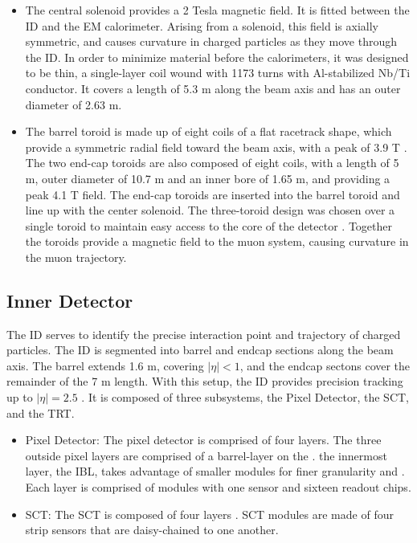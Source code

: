 \begin{itemize}
    \item The central solenoid provides a 2 Tesla magnetic field. It is fitted between the \gls{ID} and the \gls{EM} calorimeter. Arising from a solenoid, this field is axially symmetric, and causes curvature in charged particles as they move through the \gls{ID}. In order to minimize material before the calorimeters, it was designed to be thin, a single-layer coil wound with 1173 turns with Al-stabilized Nb/Ti conductor. It covers a length of 5.3 m along the beam axis and has an outer diameter of 2.63 m\cite{central-solenoid}.

    \item The barrel toroid is made up of eight coils of a flat racetrack shape, which provide a symmetric radial field toward the beam axis, with a peak of 3.9 T \cite{barrel-toroid}. The two end-cap toroids are also composed of eight coils, with a length of 5 m, outer diameter of 10.7 m and an inner bore of 1.65 m, and providing a peak 4.1 T field. The end-cap toroids are inserted into the barrel toroid and line up with the center solenoid. The three-toroid design was chosen over a single toroid to maintain easy access to the core of the detector \cite{endcap-toroid}. Together the toroids provide a magnetic field to the muon system, causing curvature in the muon trajectory.
\end{itemize}


\subsection{Inner Detector}
The \gls{ID} serves to identify the precise interaction point and trajectory of charged particles. The \gls{ID} is segmented into barrel and endcap sections along the beam axis. The barrel extends 1.6 m, covering $|\eta| < 1$, and the endcap sectons cover the remainder of the 7 m length. With this setup, the \gls{ID} provides precision tracking up to $|\eta| = 2.5$ \cite{inner-detector-tdr}. It is composed of three subsystems, the Pixel Detector, the \gls{SCT}, and the \gls{TRT}. 

\begin{itemize}
    \item Pixel Detector: The pixel detector is comprised of four layers. The three outside pixel layers are comprised of a barrel-layer on the .  the innermost layer, the \gls{IBL}, takes advantage of smaller modules for finer granularity and . Each layer is comprised of modules with one sensor and sixteen readout chips.
    
    \item \gls{SCT}: The \gls{SCT} is composed of four layers . SCT modules are made of four strip sensors that are daisy-chained to one another.
\end{itemize}

